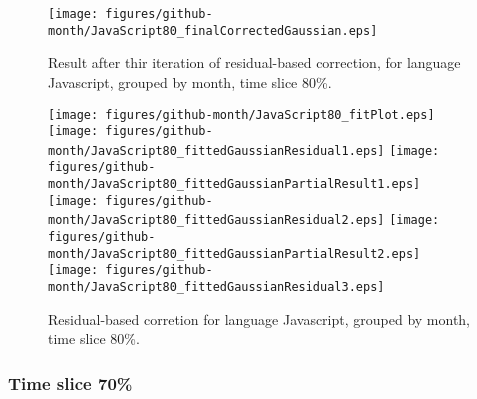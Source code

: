 \begin{figure}[]
\centering
{\texttt{[image: figures/github-month/JavaScript80\_finalCorrectedGaussian.eps]}}
\caption{Result after thir iteration of residual-based correction, for language Javascript, grouped by month, time slice 80\%.}
\end{figure}


\begin{figure}[hb]
\centering
{}
{\texttt{[image: figures/github-month/JavaScript80\_fitPlot.eps]}}
{\texttt{[image: figures/github-month/JavaScript80\_fittedGaussianResidual1.eps]}}
{\texttt{[image: figures/github-month/JavaScript80\_fittedGaussianPartialResult1.eps]}}
{\texttt{[image: figures/github-month/JavaScript80\_fittedGaussianResidual2.eps]}}
{\texttt{[image: figures/github-month/JavaScript80\_fittedGaussianPartialResult2.eps]}}
{\texttt{[image: figures/github-month/JavaScript80\_fittedGaussianResidual3.eps]}}
\caption{Residual-based corretion for language Javascript, grouped by month, time slice 80\%.}
\end{figure}


\clearpage 
\newpage 


\FloatBarrier

\subsubsection{Time slice 70\%}

